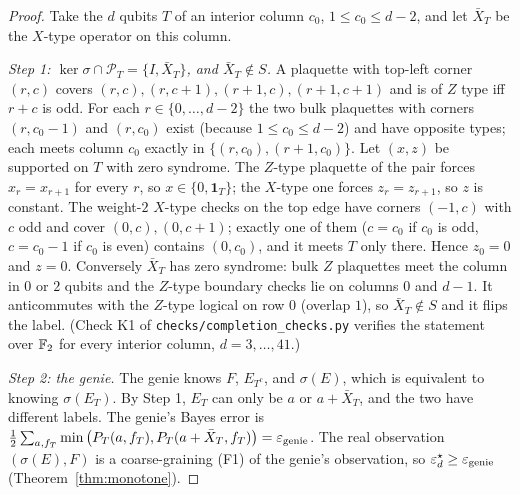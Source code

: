\begin{proof}
Take the $d$ qubits $T$ of an interior column $c_0$, $1\le c_0\le d-2$, and let $\bar X_T$ be the $X$-type operator on this column.

\emph{Step 1: $\ker\sigma\cap\mathcal P_T=\{I,\bar X_T\}$, and $\bar X_T\notin S$.} A plaquette with top-left corner $(r,c)$ covers $(r,c),(r,c+1),(r+1,c),(r+1,c+1)$ and is of $Z$ type iff $r+c$ is odd.
For each $r\in\{0,\dots,d-2\}$ the two bulk plaquettes with corners $(r,c_0-1)$ and $(r,c_0)$ exist (because $1\le c_0\le d-2$) and have opposite types; each meets column $c_0$ exactly in $\{(r,c_0),(r+1,c_0)\}$.
Let $(x,z)$ be supported on $T$ with zero syndrome. The $Z$-type plaquette of the pair forces $x_r=x_{r+1}$ for every $r$, so $x\in\{0,\mathbf 1_T\}$; the $X$-type one forces $z_r=z_{r+1}$, so $z$ is constant.
The weight-$2$ $X$-type checks on the top edge have corners $(-1,c)$ with $c$ odd and cover $(0,c),(0,c+1)$; exactly one of them ($c=c_0$ if $c_0$ is odd, $c=c_0-1$ if $c_0$ is even) contains $(0,c_0)$, and it meets $T$ only there. Hence $z_0=0$ and $z=0$.
Conversely $\bar X_T$ has zero syndrome: bulk $Z$ plaquettes meet the column in $0$ or $2$ qubits and the $Z$-type boundary checks lie on columns $0$ and $d-1$. It anticommutes with the $Z$-type logical on row $0$ (overlap $1$), so $\bar X_T\notin S$ and it flips the label.
(Check K1 of \texttt{checks/completion\_checks.py} verifies the statement over $\mathbb{F}_2$ for every interior column, $d=3,\dots,41$.)

\emph{Step 2: the genie.} The genie knows $F$, $E_{T^c}$, and $\sigma(E)$, which is equivalent to knowing $\sigma(E_T)$. By Step 1, $E_T$ can only be $a$ or $a+\bar X_T$,
and the two have different labels. The genie's Bayes error is $\tfrac12\sum_{a,f_T}\min\big(P_T(a,f_T),P_T(a+\bar X_T,f_T)\big)=\varepsilon_{\rm genie}$.
The real observation $(\sigma(E),F)$ is a coarse-graining (F1) of the genie's observation, so $\varepsilon^{\star}_d\ge\varepsilon_{\rm genie}$ (Theorem~\ref{thm:monotone}).


\end{proof}
